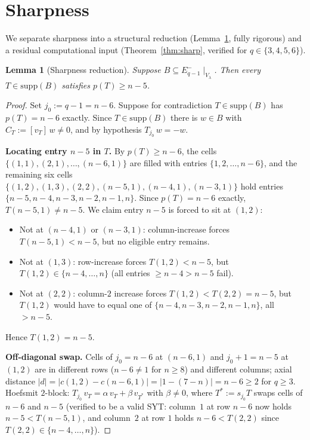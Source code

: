 \documentclass[11pt]{article}
\newtheorem{lemma}[theorem]{Lemma}
\theoremstyle{definition}
\newcommand{\supp}{\mathrm{supp}}
\begin{document}
\section{Sharpness}\label{sec:sharp}

We separate sharpness into a structural reduction
(Lemma~\ref{lem:sharp-reduction}, fully rigorous) and a residual
computational input (Theorem~\ref{thm:sharp}, verified for
$q \in \{3, 4, 5, 6\}$).

\begin{lemma}[Sharpness reduction]\label{lem:sharp-reduction}
Suppose $B \subseteq E_{q - 1}^-\!\mid_{V_\lambda}$.  Then every
$T \in \supp(B)$ satisfies $p(T) \ge n - 5$.
\end{lemma}

\begin{proof}
Set $j_0 := q - 1 = n - 6$.  Suppose for contradiction
$T \in \supp(B)$ has $p(T) = n - 6$ exactly.  Since $T \in \supp(B)$
there is $w \in B$ with $C_T := [v_T]\,w \ne 0$, and by hypothesis
$T_{j_0}\,w = -w$.

\medskip\textbf{Locating entry $n - 5$ in $T$.}  By $p(T) \ge n - 6$,
the cells $\{(1, 1), (2, 1), \ldots, (n - 6, 1)\}$ are filled with
entries $\{1, 2, \ldots, n - 6\}$, and the remaining six cells
$\{(1, 2), (1, 3), (2, 2), (n - 5, 1), (n - 4, 1), (n - 3, 1)\}$ hold
entries $\{n - 5, n - 4, n - 3, n - 2, n - 1, n\}$.  Since $p(T) =
n - 6$ exactly, $T(n - 5, 1) \ne n - 5$.  We claim entry $n - 5$ is
forced to sit at $(1, 2)$:
\begin{itemize}[topsep=0.3em,itemsep=0.1em]
\item Not at $(n - 4, 1)$ or $(n - 3, 1)$: column-increase forces
  $T(n - 5, 1) < n - 5$, but no eligible entry remains.
\item Not at $(1, 3)$: row-increase forces $T(1, 2) < n - 5$, but
  $T(1, 2) \in \{n - 4, \ldots, n\}$ (all entries $\ge n - 4 > n - 5$
  fail).
\item Not at $(2, 2)$: column-$2$ increase forces $T(1, 2) <
  T(2, 2) = n - 5$, but $T(1, 2)$ would have to equal one of
  $\{n - 4, n - 3, n - 2, n - 1, n\}$, all $> n - 5$.
\end{itemize}
Hence $T(1, 2) = n - 5$.

\medskip\textbf{Off-diagonal swap.}  Cells of $j_0 = n - 6$ at
$(n - 6, 1)$ and $j_0 + 1 = n - 5$ at $(1, 2)$ are in different rows
($n - 6 \ne 1$ for $n \ge 8$) and different columns; axial distance
$|d| = |c(1, 2) - c(n - 6, 1)| = |1 - (7 - n)| = n - 6 \ge 2$ for
$q \ge 3$.  Hoefsmit $2$-block:
$T_{j_0}\,v_T = \alpha\,v_T + \beta\,v_{T^*}$ with $\beta \ne 0$,
where $T^* := s_{j_0} T$ swaps cells of $n - 6$ and $n - 5$
(verified to be a valid SYT: column~$1$ at row $n - 6$ now holds
$n - 5 < T(n - 5, 1)$, and column~$2$ at row $1$ holds $n - 6 <
T(2, 2)$ since $T(2, 2) \in \{n - 4, \ldots, n\}$).


\end{proof}
\end{document}

